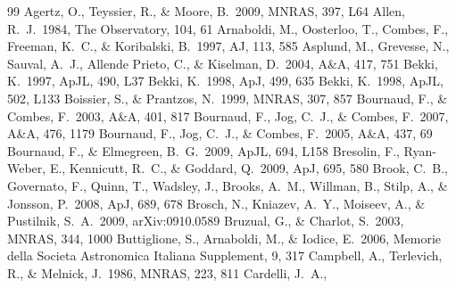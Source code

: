 \documentclass[12pt,preprint]{aastex}
\begin{document}


\begin{thebibliography}{99}
 Agertz, O., Teyssier,
R., \& Moore, B.\ 2009, MNRAS, 397, L64
 Allen, R.~J.\ 1984, The
Observatory, 104, 61
 Arnaboldi, M., Oosterloo, T.,
  Combes, F., Freeman, K.~C., \& Koribalski, B.\ 1997, AJ, 113, 585
 Asplund, M., Grevesse, N.,
  Sauval, A.~J., Allende Prieto, C., \& Kiselman, D.\ 2004, A\&A, 417,
  751
 Bekki, K.\ 1997, ApJL, 490, L37
 Bekki, K.\ 1998, ApJ, 499, 635
 Bekki, K.\ 1998, ApJL, 502, L133
 Boissier, S., \& Prantzos,
  N.\ 1999, MNRAS, 307, 857
 Bournaud, F., \& Combes,
  F.\ 2003, A\&A, 401, 817
 Bournaud, F., Jog, C.~J., \& Combes, F.\ 2007, A\&A, 476, 1179
 Bournaud, F., Jog, C.~J., \&
  Combes, F.\ 2005, A\&A, 437, 69
 Bournaud, F., \&
  Elmegreen, B.~G.\ 2009, ApJL, 694, L158
 Bresolin, F.,
Ryan-Weber, E., Kennicutt, R.~C., \& Goddard, Q.\ 2009, ApJ, 695, 580
 Brook, C.~B., Governato,
F., Quinn, T., Wadsley, J., Brooks, A.~M., Willman, B., Stilp, A.,
\& Jonsson, P.\ 2008, ApJ, 689, 678
 Brosch, N., Kniazev, A.~Y.,
  Moiseev, A., \& Pustilnik, S.~A.\ 2009, arXiv:0910.0589
 Bruzual, G., \& Charlot, S.\ 2003, MNRAS, 344, 1000
 Buttiglione, S.,
Arnaboldi, M., \& Iodice, E.\ 2006, Memorie della Societa
Astronomica Italiana Supplement, 9, 317
 Campbell, A.,
Terlevich, R., \& Melnick, J.\ 1986, MNRAS, 223, 811
 Cardelli, J.~A.,

\end{thebibliography}
\end{document}
